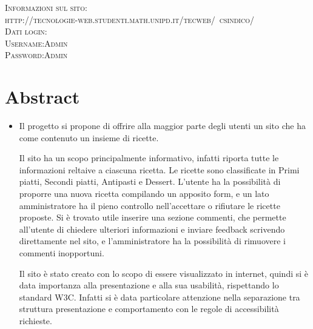 \documentclass[12pt]{article}
\begin{document}
\begin{titlepage}
		
		\textsc{\Large Informazioni sul sito:}\\[0.3cm]	
		\textsc{http://tecnologie-web.studenti.math.unipd.it/tecweb/~csindico/}\\[1cm]
		
		
			\textsc{\Large Dati login:}\\[0.3cm]
			\textsc{ Username:Admin}\\[0.1mm]
			\textsc{ Password:Admin}\\[0.1mm]
			
		\vfill
	\end{titlepage}
	
	\newpage
	\renewcommand{\contentsname}{Indice}
	\tableofcontents
	
	
	\newpage
	
	\section{Abstract}
	\begin{itemize}
		\item Il progetto si propone di offrire  alla maggior parte degli utenti  un sito che ha come contenuto un insieme di ricette. 
			
		Il sito ha un scopo principalmente informativo, infatti riporta tutte le informazioni reltaive a ciascuna ricetta. Le ricette sono classificate in Primi piatti, Secondi piatti, Antipasti e Dessert. L'utente ha la possibilità di proporre una nuova ricetta compilando un apposito form, e un lato amministratore ha il pieno controllo nell'accettare o rifiutare le ricette proposte. Si è trovato utile inserire una sezione commenti, che permette all'utente di chiedere ulteriori informazioni e inviare feedback scrivendo direttamente nel sito, e l'amministratore ha la possibilità di rimuovere i commenti inopportuni.
		
		Il sito è stato creato con lo scopo di essere visualizzato in internet, quindi si è data importanza alla presentazione e alla sua usabilità, rispettando lo standard W3C. Infatti si è data particolare attenzione nella separazione tra struttura presentazione e comportamento con le regole di accessibilità richieste.
	\end{itemize}
\end{document}
